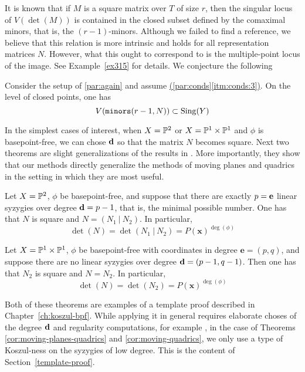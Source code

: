 \documentclass[fleqn,reqno]{amsart}
\renewcommand{\itmref}[2]{{\normalfont\hyperref[#1]{(\ref*{#2}\ref*{#1})}}}
\begin{document}
\begin{paragraf*}
It is known that if $M$ is a square matrix over $T$ of size $r$,
then the singular locus of $V(\det(M))$ is contained in the closed subset defined by the
comaximal minors, that is, the $(r-1)$-minors.
Although we failed to find a reference,
we believe that this relation is more intrinsic and holds for all representation matrices $N$.
However, what this ought to correspond to is the multiple-point locus of the image.
See Example~\ref{ex315} for details.
We conjecture the following
\end{paragraf*}

\begin{conjecture}
\label{conj:sing-locus}
Consider the setup of \eqref{par:again} and assume \itmref{itm:conds:3}{par:conds}.
On the level of closed points, one has
\[
	V(\mathop{\tt minors}(r-1,N))\subset\mathrm{Sing}(Y)
\]
\end{conjecture}

\begin{paragraf*}
In the simplest cases of interest, when $X=\mathbb{P}^2$ or $X=\mathbb{P}^1\times\mathbb{P}^1$ and $\phi$ is basepoint-free,
we can chose $\mathbf d$ so that the matrix $N$ becomes square.
Next two theorems are slight generalizations of the results in \citet{CGZ-00}.
More importantly, they show that our methods directly generalize the methods of
moving planes and quadrics in the setting in which they are most useful.
\end{paragraf*}

\begin{theorem}
\label{cor:moving-planes-quadrics}
Let $X=\mathbb{P}^2$, $\phi$ be basepoint-free,
and suppose that there are exactly $p=\mathbf e$ linear syzygies over degree $\mathbf d=p-1$,
that is, the minimal possible number.
One has that $N$ is square and $N=(N_1~|~N_2)$.
In particular,
\[
	\det(N)=\det(N_1~|~N_2)=P(\mathbf x)^{\deg(\phi)}
\]
\end{theorem}

\begin{theorem}
\label{cor:moving-quadrics}
Let $X=\mathbb{P}^1\times\mathbb{P}^1$, $\phi$ be basepoint-free with coordinates in degree $\mathbf e=(p,q)$,
and suppose there are no linear syzygies over degree $\mathbf d=(p-1,q-1)$.
Then one has that $N_2$ is square and $N=N_2$.
In particular,
\[
	\det(N)=\det(N_2)=P(\mathbf x)^{\deg(\phi)}
\]
\end{theorem}

\begin{paragraf*}
Both of these theorems are examples of a template proof described in Chapter~\ref{ch:koszul-bpf}.
While applying it in general requires elaborate choses of the degree $\mathbf d$ and
regularity computations, for example \citet{AHW-05},
in the case of Theorems \ref{cor:moving-planes-quadrics} and \ref{cor:moving-quadrics},
we only use a type of Koszul-ness on the syzygies of low degree.
This is the content of Section~\ref{template-proof}.
\end{paragraf*}
\end{document}
